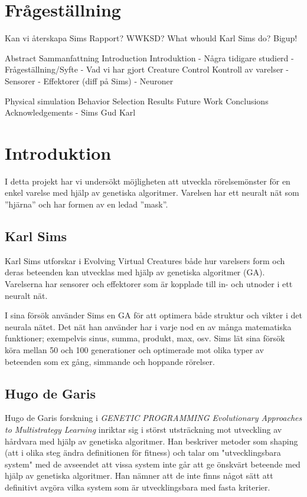 \documentclass[titlepage, twocolumn, a4paper, 12pt]{article}
\begin{document}
\section{Frågeställning}
Kan vi återskapa Sims Rapport? WWKSD? What whould Karl Sims do? Bigup!


Abstract Sammanfattning
Introduction Introduktion
    - Några tidigare studierd
    - Frågeställning/Syfte
    - Vad vi har gjort
Creature Control Kontroll av varelser
  - Sensorer
  - Effektorer (diff på Sims)
  - Neuroner
  
Physical simulation
Behavior Selection
Results
Future Work
Conclusions
Acknowledgements
    - Sims Gud Karl



\section{Introduktion}

I detta projekt har vi undersökt möjligheten att utveckla rörelsemönster för en enkel varelse med hjälp av genetiska algoritmer. Varelsen har ett neuralt nät som ”hjärna” och har formen av en ledad ”mask”.

\subsection{Karl Sims}
Karl Sims utforskar i Evolving Virtual Creatures \cite{sims} både hur varelsers form och deras beteenden kan utvecklas med hjälp av genetiska algoritmer (GA). Varelserna har sensorer och effektorer som är kopplade till in- och utnoder i ett neuralt nät. 

I sina försök använder Sims en GA för att optimera både struktur och vikter i det neurala nätet. Det nät han använder har i varje nod en av många matematiska funktioner; exempelvis sinus, summa, produkt, max, osv. Sims lät sina försök köra mellan 50 och 100 generationer och optimerade mot olika typer av beteenden som ex gång, simmande och hoppande rörelser. 

\subsection{Hugo de Garis}
Hugo de Garis forskning i \textit{GENETIC PROGRAMMING Evolutionary Approaches to Multistrategy Learning} \cite{garis} inriktar sig i störst utsträckning mot utveckling av hårdvara med hjälp av genetiska algoritmer. Han beskriver metoder som shaping (att i olika steg ändra definitionen för fitness) och talar om "utvecklingsbara system" med de avseendet att vissa system inte går att ge önskvärt beteende med hjälp av genetiska algoritmer. Han nämner att de inte finns något sätt att definitivt avgöra vilka system som är utvecklingsbara med fasta kriterier.
\end{document}
